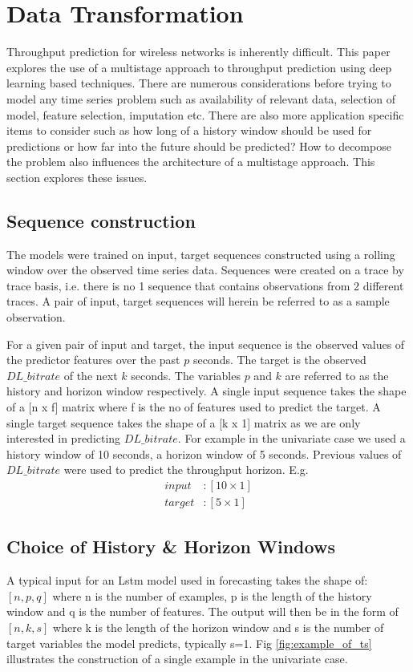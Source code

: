 \chapter{Data Transformation}
Throughput prediction for wireless networks is inherently difficult. This paper explores the use of a multistage approach to throughput prediction using deep learning based techniques. There are numerous considerations before trying to model any time series problem such as availability of relevant data, selection of model, feature selection, imputation etc. There are also more application specific items to consider such as how long of a history window should be used for predictions or how far into the future should be predicted? How to decompose the problem also influences the architecture of a multistage approach. This section explores these issues.

\section{Sequence construction}
The models were trained on input, target sequences constructed using a rolling window over the observed time series data. Sequences were created on a trace by trace basis, i.e. there is no 1 sequence that contains observations from 2 different traces. A pair of input, target sequences will herein be referred to as a sample observation.

For a given pair of input and target, the input sequence is the observed values of the predictor features over the past $p$ seconds. The target is the observed $DL\_bitrate$ of the next $k$ seconds. The variables $p$ and $k$ are referred to as the history and horizon window respectively. A single input sequence takes the shape of a [n x f] matrix where f is the no of features used to predict the target. A single target sequence takes the shape of a [k x 1] matrix as we are only interested in predicting $DL\_bitrate$. For example in the univariate case we used a history window of 10 seconds, a horizon window of 5 seconds. Previous values of $DL\_bitrate$ were used to predict the throughput horizon. E.g.
\begin{equation}
\begin{aligned}
 input&: [10 \times 1] \\
 target&: [5 \times 1]
\end{aligned}
\end{equation}

\section{Choice of History \& Horizon Windows}
A typical input for an Lstm model used in forecasting takes the shape of: $[ n, p, q ]$ where n is the number of examples, p is the length of the history window and q is the number of features. The output will then be in the form of $[n, k, s ]$ where k is the length of the horizon window and s is the number of target variables the model predicts, typically s=1. Fig \ref{fig:example_of_ts} illustrates the construction of a single example in the univariate case.

